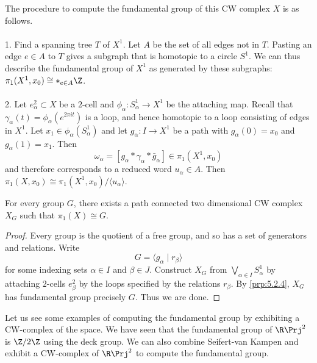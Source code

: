 \documentclass[a4paper]{article}
\begin{document}
The procedure to compute the fundamental group of this CW complex $X$ is as follows. \\~\\
1. Find a spanning tree $T$ of $X^1$. Let $A$ be the set of all edges not in $T$. Pasting an edge $e\in A$ to $T$ gives a subgraph that is homotopic to a circle $S^1$. We can thus describe the fundamental group of $X^1$ as generated by these subgraphs: $\pi_1(X^1,x_0)\cong\ast_{e\in A}\Z$. \\~\\
2. Let $e_\alpha^2\subset X$ be a $2$-cell and $\phi_\alpha:S_\alpha^1\to X^1$ be the attaching map. Recall that $\gamma_\alpha(t)=\phi_\alpha(e^{2\pi it})$ is a loop, and hence homotopic to a loop consisting of edges in $X^1$. Let $x_1\in\phi_\alpha(S_\alpha^1)$ and let $g_\alpha:I\to X^1$ be a path with $g_\alpha(0)=x_0$ and $g_\alpha(1)=x_1$. Then $$\omega_\alpha=[g_\alpha\ast\gamma_\alpha\ast\bar{g}_\alpha]\in\pi_1(X^1,x_0)$$ and therefore corresponds to a reduced word $u_\alpha\in A$. Then $\pi_1(X,x_0)\cong\pi_1(X^1,x_0)/\langle u_\alpha\rangle$. 

\begin{thm}{}{} For every group $G$, there exists a path connected two dimensional CW complex $X_G$ such that $\pi_1(X)\cong G$. \tcbline
\begin{proof}
Every group is the quotient of a free group, and so has a set of generators and relations. Write $$G=\langle g_\alpha\;|\;r_\beta\rangle$$ for some indexing sets $\alpha\in I$ and $\beta\in J$. Construct $X_G$ from $\bigvee_{\alpha\in I}S_\alpha^1$ by attaching $2$-cells $e_\beta^2$ by the loops specified by the relations $r_\beta$. By \ref{prp:5.2.4}, $X_G$ has fundamental group precisely $G$. Thus we are done. 
\end{proof}
\end{thm}

Let us see some examples of computing the fundamental group by exhibiting a CW-complex of the space. We have seen that the fundamental group of $\R\Prj^2$ is $\Z/2\Z$ using the deck group. We can also combine Seifert-van Kampen and exhibit a CW-complex of $\R\Prj^2$ to compute the fundamental group. 
\end{document}
